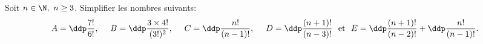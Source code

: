 
\begin{exercice}  \;
\noindent Soit $n\in\N,\ n\geq 3$. Simplifier les nombres suivants:
$$A=\ddp\frac{7!}{6!},\ \ \ \ B=\ddp\frac{3\times 4!}{(3!)^2},\ \ \ \ 
C=\ddp\frac{n!}{(n-1)!},\ \ \ \ D=\ddp\frac{(n+1)!}{(n-3)!}\ \ \hbox{et}\ \ E=\ddp\frac{(n+1)!}{(n-2)!}+\ddp\frac{n!}{(n-1)!}.$$
\end{exercice}